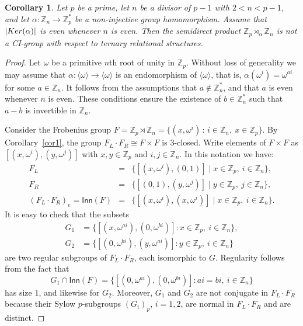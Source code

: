 \documentclass[10pt,a4paper]{amsart}
\newtheorem{cor}{Corollary}
\def\Ker{{\rm Ker}}
\def\Z{{\mathbb Z}}
\begin{document}
	\begin{cor}\label{cor2}Let $p$ be a prime,  let $n$ be a divisor of $p-1$ with $2 < n < p-1$, and let $\alpha\colon \Z_n\rightarrow \Z_p^*$ be a non-injective group homomorphism. Assume that $|\Ker(\alpha)|$ is even whenever $n$ is even.  Then the semidirect product $\Z_p\rtimes_\alpha\Z_n$ is not a CI-group with respect to ternary relational structures.
	\end{cor}

	\begin{proof}Let $\omega$ be a primitive $n$th root of unity in $\Z_p$.  
		Without loss of generality we may assume that 
		$\alpha\colon \langle \omega \rangle \rightarrow \langle \omega \rangle$ 
		is an endomorphism of $\langle \omega \rangle$, that is, 
		$\alpha(\omega^i)=\omega^{ai}$ for some $a\in \Z_n$.  
		It follows from the assumptions that $a\notin \Z_n^*$, and that $a$ is even whenever $n$ is even.  
		These conditions ensure the existence of $b\in \Z_n^*$ such that $a-b$ is invertible in $\Z_n$.
		
		Consider the Frobenius group 
		$F=\Z_p\rtimes \Z_n = \{(x,\omega^i)\,:\,i\in\Z_n,\ x\in\Z_p\}$.  
		By Corollary~\ref{cor1}, the group $F_L\cdot F_R\cong F\times F$ is $3$-closed.  
		Write elements of $F\times F$ as $[(x,\omega^i),(y,\omega^j)]$ with $x,y\in\Z_p$ and $i,j\in\Z_n$.  
		In this notation we have:
		$$
		\begin{array}{rcl}
			F_L & = & \{[(x,\omega^i),(0,1)] \mid x\in \Z_p,\ i\in\Z_n\},\\ 
			F_R & = & \{[(0,1),(y,\omega^j)] \mid y\in \Z_p,\ j\in\Z_n\},\\
			(F_L\cdot F_R)_e = \mathsf{Inn}(F) 
			& = & 
			\{[(x,\omega^i),(x,\omega^i)] \mid x\in \Z_p,\ i\in\Z_n\}.
		\end{array}
		$$
		It is easy to check that the subsets
		\begin{align*}
			G_1 &= \{[(x,\omega^{ai}),(0,\omega^{bi})] : x\in\Z_p,\ i\in\Z_n\},\\
			G_2 &= \{[(0,\omega^{bi}),(y,\omega^{ai})] : y\in\Z_p,\ i\in\Z_n\}
		\end{align*}
		are two regular subgroups of $F_L\cdot F_R$, each isomorphic to $G$.  
		Regularity follows from the fact that 
		\[
		G_1 \cap \mathsf{Inn}(F)
		= \{[(0,\omega^{ai}),(0,\omega^{bi})] : ai = bi,\ i\in\Z_n\}
		\]
		has size $1$, and likewise for $G_2$.  
		Moreover, $G_1$ and $G_2$ are not conjugate in $F_L\cdot F_R$ because their Sylow $p$-subgroups $(G_i)_p$, $i=1,2$, are normal in $F_L\cdot F_R$ and are distinct.
	\end{proof}
\end{document}

